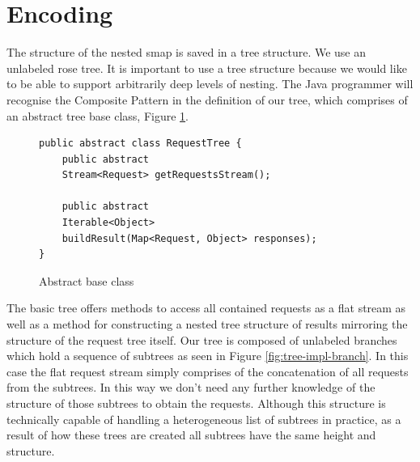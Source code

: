 \section{Encoding}

The structure of the nested smap is saved in a tree structure.
We use an unlabeled rose tree\cite{MALCOLM1990255}.
It is important to use a tree structure because we would like to be able to support arbitrarily deep levels of nesting.
The Java programmer will recognise the Composite Pattern in the definition of our tree, which comprises of an abstract tree base class, Figure \ref{fig:tree-impl-base-class}.

\begin{figure}

\begin{verbatim}
public abstract class RequestTree {
    public abstract
    Stream<Request> getRequestsStream();

    public abstract
    Iterable<Object>
    buildResult(Map<Request, Object> responses);
}
\end{verbatim}
\caption{Abstract base class}
\label{fig:tree-impl-base-class}

\end{figure}

The basic tree offers methods to access all contained requests as a flat stream as well as a method for constructing a nested tree structure of results mirroring the structure of the request tree itself.
Our tree is composed of unlabeled branches which hold a sequence of subtrees as seen in Figure \ref{fig:tree-impl-branch}.
In this case the flat request stream simply comprises of the concatenation of all requests from the subtrees.
In this way we don't need any further knowledge of the structure of those subtrees to obtain the requests.
Although this structure is technically capable of handling a heterogeneous list of subtrees in practice, as a result of how these trees are created all subtrees have the same height and structure.

